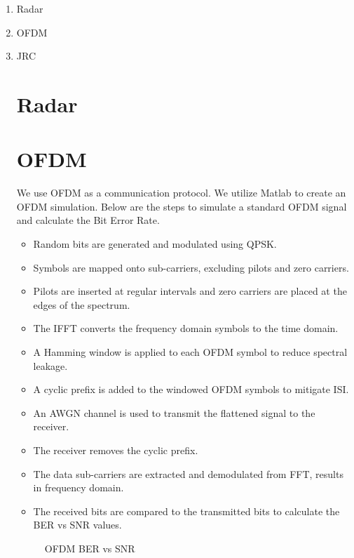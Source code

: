 \documentclass[onecolumn,conference]{IEEEtran}
\begin{document}
	\begin{enumerate}
		\item Radar
          \item OFDM
        \item JRC\par
        
   \section {Radar}

     \section {OFDM}
We use OFDM as a communication protocol. We utilize Matlab to create an OFDM simulation. Below are the steps to simulate a standard OFDM signal and calculate the Bit Error Rate.
\begin{itemize}
\item Random bits are generated and modulated using QPSK. 
\item Symbols are mapped onto sub-carriers, excluding pilots and zero carriers.
\item Pilots are inserted at regular intervals and zero carriers are placed at the edges of the spectrum.
\item The IFFT converts the frequency domain symbols to the time domain. 
\item A Hamming window is applied to each OFDM symbol to reduce spectral leakage. 
\item A cyclic prefix is added to the windowed OFDM symbols to mitigate ISI. 
\item An AWGN channel is used to transmit the flattened signal to the receiver.\par
\item The receiver removes the cyclic prefix. 
\item The data sub-carriers are extracted and demodulated from FFT, results in frequency domain. 
\item The received bits are compared to the transmitted bits to calculate the BER vs SNR values. 
\end{itemize}

	\begin{figure}[H]
    		\centering
    		\caption{OFDM BER vs SNR}
	\end{figure}


\end{enumerate}
\end{document}
